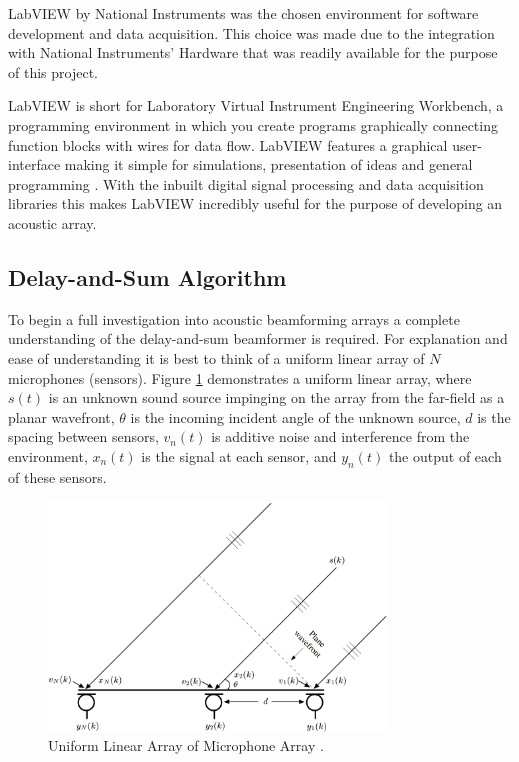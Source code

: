 \documentclass{UoNMCHA}
\numberwithin{equation}{section}
\begin{document}
    LabVIEW by National Instruments was the chosen environment for software development and data acquisition. This choice was made due to the integration with National Instruments' Hardware that was readily available for the purpose of this project. 
    
    LabVIEW is short for Laboratory Virtual Instrument Engineering Workbench, a programming environment in which you create programs graphically connecting function blocks with wires for data flow. LabVIEW features a graphical user-interface making it simple for simulations, presentation of ideas and general programming \citep{Tra06}. With the inbuilt digital signal processing and data acquisition libraries this makes LabVIEW incredibly useful for the purpose of developing an acoustic array.
\subsection{Delay-and-Sum Algorithm} \label{sec:Software DAS}
    To begin a full investigation into acoustic beamforming arrays a complete understanding of the delay-and-sum beamformer is required. For explanation and ease of understanding it is best to think of a uniform linear array of $N$ microphones (sensors). Figure \ref{fig:ULA} demonstrates a uniform linear array, where $s(t)$ is an unknown sound source impinging on the array from the far-field as a planar wavefront, $\theta$ is the incoming incident angle of the unknown source, $d$ is the spacing between sensors, $v_n(t)$ is additive noise and interference from the environment, $x_n(t)$ is the signal at each sensor, and $y_n(t)$ the output of each of these sensors.
    
    \begin{figure} [H]
        \centering
        \includegraphics[keepaspectratio, width = 0.8\textwidth]{Figures/ULA.png}
        \caption{Uniform Linear Array of Microphone Array \citep{Ben08}.}
        \label{fig:ULA}
    \end{figure}
    
\end{document}
